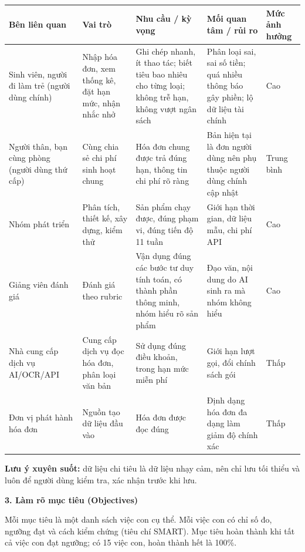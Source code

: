 \documentclass[a4paper,14pt]{extarticle}
\renewcommand{\arraystretch}{1.08}
\newcommand{\TableText}{\footnotesize}
\newcommand{\TableStart}{%
    \begingroup
    \TableText
    \renewcommand{\arraystretch}{1.05}
}
\newcommand{\TableEnd}{\endgroup}
\begin{document}
\TableStart
\begingroup
\normalsize
\begin{tabularx}{\textwidth}{
    |P{2.8cm}|P{2.0cm}|P{3.4cm}|P{4.0cm}|Y|
}
\hline
\textbf{Bên liên quan}
& \textbf{Vai trò}
& \textbf{Nhu cầu / kỳ vọng}
& \textbf{Mối quan tâm / rủi ro}
& \textbf{Mức ảnh hưởng}
\\
\hline
Sinh viên, người đi làm trẻ (người dùng chính)
& Nhập hóa đơn, xem thống kê, đặt hạn mức, nhận nhắc nhở
& Ghi chép nhanh, ít thao tác; biết tiêu bao nhiêu cho từng loại; không trễ hạn, không vượt ngân sách
& Phân loại sai, sai số tiền; quá nhiều thông báo gây phiền; lộ dữ liệu tài chính
& Cao
\\
\hline
Người thân, bạn cùng phòng (người dùng thứ cấp)
& Cùng chia sẻ chi phí sinh hoạt chung
& Hóa đơn chung được trả đúng hạn, thông tin chi phí rõ ràng
& Bản hiện tại là đơn người dùng nên phụ thuộc người dùng chính cập nhật
& Trung bình
\\
\hline
Nhóm phát triển
& Phân tích, thiết kế, xây dựng, kiểm thử
& Sản phẩm chạy được, đúng phạm vi, đúng tiến độ 11 tuần
& Giới hạn thời gian, dữ liệu mẫu, chi phí API
& Cao
\\
\hline
Giảng viên đánh giá
& Đánh giá theo rubric
& Vận dụng đúng các bước tư duy tính toán, có thành phần thông minh, nhóm hiểu rõ sản phẩm
& Đạo văn, nội dung do AI sinh ra mà nhóm không hiểu
& Cao
\\
\hline
Nhà cung cấp dịch vụ AI/OCR/API
& Cung cấp dịch vụ đọc hóa đơn, phân loại văn bản
& Sử dụng đúng điều khoản, trong hạn mức miễn phí
& Giới hạn lượt gọi, đổi chính sách gói
& Thấp
\\
\hline
Đơn vị phát hành hóa đơn
& Nguồn tạo dữ liệu đầu vào
& Hóa đơn được đọc đúng
& Định dạng hóa đơn đa dạng làm giảm độ chính xác
& Thấp
\\
\hline
\end{tabularx}
\endgroup
\TableEnd

\vspace{0.15cm}

\textbf{Lưu ý xuyên suốt:} dữ liệu chi tiêu là dữ liệu nhạy cảm,
nên chỉ lưu tối thiểu và luôn để người dùng kiểm tra, xác nhận
trước khi lưu.

\vspace{0.5cm}
\newpage
{\large\bfseries 3. Làm rõ mục tiêu (Objectives)}

Mỗi mục tiêu là một danh sách việc con cụ thể. Mỗi việc con có
chỉ số đo, ngưỡng đạt và cách kiểm chứng (tiêu chí SMART).
Mục tiêu hoàn thành khi tất cả việc con đạt ngưỡng; có 15 việc
con, hoàn thành hết là 100\%.
\end{document}
